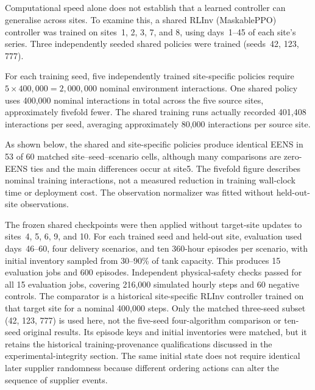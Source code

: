 \subsection[Cross-Site Zero-Shot Generalisation]
{}
\label{sec:g5b_zero_shot}
\begin{revisedblock}
Computational speed alone does not establish that a learned
controller can generalise across sites. To examine this,
a shared RLInv (MaskablePPO) controller was trained on
sites~1, 2, 3, 7, and 8, using days~1--45 of each site's
series. Three independently seeded shared policies were
trained (seeds~42, 123, 777).

For each training seed, five independently trained
site-specific policies require
$5 \times 400{,}000 = 2{,}000{,}000$ nominal environment
interactions. One shared policy uses 400,000 nominal
interactions in total across the five source sites,
approximately fivefold fewer. The shared training
runs actually recorded 401,408 interactions per seed,
averaging approximately 80,000 interactions per
source site.

As shown below, the shared and site-specific policies
produce identical EENS in 53 of 60 matched
site--seed--scenario cells, although many comparisons
are zero-EENS ties and the main differences occur at
site5. The fivefold figure describes nominal training
interactions, not a measured reduction in training
wall-clock time or deployment cost. The observation
normalizer was fitted without held-out-site observations.

The frozen shared checkpoints were then applied without target-site
updates to sites~4, 5, 6, 9, and 10. For each trained seed and held-out
site, evaluation used days~46--60, four delivery scenarios, and ten
360-hour episodes per scenario, with initial inventory sampled from
30--90\% of tank capacity. This produces 15 evaluation jobs and 600
episodes. Independent physical-safety checks passed for
all 15 evaluation jobs, covering 216,000
simulated hourly steps and 60 negative controls. The comparator is a historical site-specific RLInv
controller trained on that target site for a nominal 400,000 steps.
Only the matched three-seed subset (42, 123, 777) is used here,
not the five-seed four-algorithm comparison or ten-seed original results. Its episode keys and
initial inventories were matched, but it retains
the historical training-provenance qualifications discussed in the
experimental-integrity section. The same initial state does not require
identical later supplier randomness because different ordering actions
can alter the sequence of supplier events.
\end{revisedblock}

